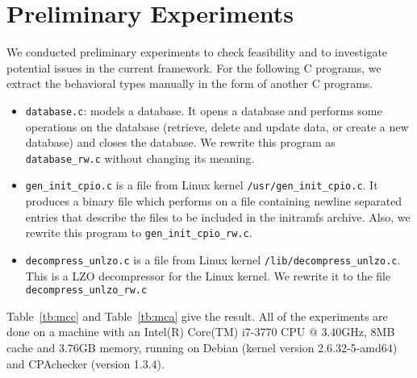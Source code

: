 \section{Preliminary Experiments}
\label{sec:experiment}


We conducted preliminary experiments to check feasibility and to
investigate potential issues in the current framework.  For the
following C programs, we extract the behavioral types manually in the
form of another C programs.
\begin{itemize}
\item \texttt{database.c}: models a database. It opens a database and
  performs some operations on the database (retrieve, delete and
  update data, or create a new database) and closes the database. We
  rewrite this program as \texttt{database\_rw.c} without changing its
  meaning.
\item \texttt{gen\_init\_cpio.c} is a file from Linux kernel
  \texttt{/usr/gen\_init\_cpio.c}. It produces a binary file which
  performs on a file containing newline separated entries that
  describe the files to be included in the initramfs archive. Also, we
  rewrite this program to \texttt{gen\_init\_cpio\_rw.c}.
  \item \texttt{decompress\_unlzo.c} is a file from Linux kernel
    \texttt{/lib/decompress\_unlzo.c}. This is a LZO decompressor for
    the Linux kernel. We rewrite it to the file
    \texttt{decompress\_unlzo\_rw.c}
\end{itemize}

Table~\ref{tb:mcc} and Table~\ref{tb:mca} give the result.  All of the
experiments are done on a machine with an Intel(R) Core(TM) i7-3770
CPU @ 3.40GHz, 8MB cache and 3.76GB memory, running on Debian (kernel
version 2.6.32-5-amd64) and CPAchecker (version 1.3.4).


